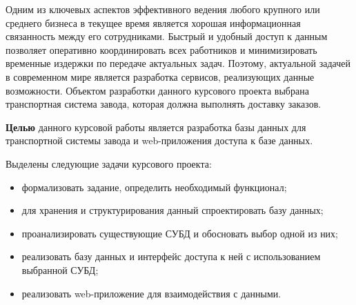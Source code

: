 Одним из ключевых аспектов эффективного ведения любого крупного или среднего бизнеса в текущее время является хорошая информационная связанность между его сотрудниками. Быстрый и удобный доступ к данным позволяет оперативно координировать всех работников и минимизировать временные издержки по передаче актуальных задач. Поэтому, актуальной задачей в современном мире является разработка сервисов, реализующих данные возможности. Объектом разработки данного курсового проекта выбрана транспортная система завода, которая должна выполнять доставку заказов.

\textbf{Целью} данного курсовой работы является разработка базы данных для транспортной системы завода и web-приложения доступа к базе данных.

Выделены следующие задачи курсового проекта:
\begin{itemize}
	\item формализовать задание, определить необходимый функционал;
	\item для хранения и структурирования данный спроектировать базу данных;
	\item проанализировать существующие СУБД и обосновать выбор одной из них;
	\item реализовать базу данных и интерфейс доступа к ней с использованием выбранной СУБД;
	\item реализовать web-приложение для взаимодействия с данными.
\end{itemize}
